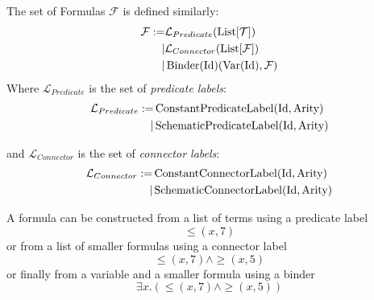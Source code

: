 \begin{defin}[Formulas]
  The set of Formulas $\mathcal{F}$ is defined similarly:
  \begin{equation}
    \begin{split}
      \mathcal{F} := & \mathcal{L}_{Predicate}(\operatorname{List}[\mathcal{T}]) \\
      \mid & \mathcal{L}_{Connector}(\operatorname{List}[\mathcal{F}]) \\
      \mid & \operatorname{Binder}(\textnormal{Id})(\operatorname{Var}(\textnormal{Id}), \mathcal{F})
    \end{split}
  \end{equation}
  Where $\mathcal{L}_{Predicate}$ is the set of \textit{predicate labels}:
  \begin{equation}
    \begin{split}
      \mathcal{L}_{Predicate} := & \operatorname{ConstantPredicateLabel}(\textnormal{Id}, \textnormal{Arity})\\
      \mid & \operatorname{SchematicPredicateLabel}(\textnormal{Id}, \textnormal{Arity})
    \end{split}
  \end{equation}

  and $\mathcal{L}_{Connector}$ is the set of \textit{connector labels}:
  \begin{equation}
    \begin{split}
      \mathcal{L}_{Connector} := & \operatorname{ConstantConnectorLabel}(\textnormal{Id}, \textnormal{Arity})\\
      \mid & \operatorname{SchematicConnectorLabel}(\textnormal{Id}, \textnormal{Arity})
    \end{split}
  \end{equation}

  A formula can be constructed from a list of terms using a predicate label
  $${\leq}(x, 7)$$
  or from a list of smaller formulas using a connector label
  $${\leq}(x, 7) \land {\geq}(x, 5)$$
  or finally from a variable and a smaller formula using a binder
  $$\exists x. \left({\leq}(x, 7) \land {\geq}(x, 5)\right)$$


\end{defin}
